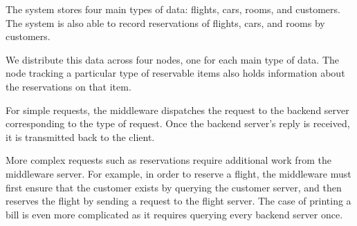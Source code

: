 \documentclass[letterpaper,11pt]{article}
\begin{document}
The system stores four main types of data: flights, cars, rooms, and customers.
The system is also able to record reservations of flights, cars, and rooms by
customers.

We distribute this data across four nodes, one for each main type of data. The
node tracking a particular type of reservable items also holds information
about the reservations on that item.

For simple requests, the middleware dispatches the request to the backend
server corresponding to the type of request. Once the backend server's reply is
received, it is transmitted back to the client.

More complex requests such as reservations require additional work from the
middleware server. For example, in order to reserve a flight, the middleware
must first ensure that the customer exists by querying the customer server,
and then reserves the flight by sending a request to the flight server. The
case of printing a bill is even more complicated as it requires querying every
backend server once.
\end{document}
